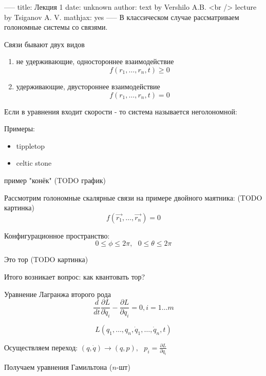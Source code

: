 -----
title: Лекция 1
date: unknown
author: text by Vershilo A.B. <br /> lecture by Tsiganov A. V.
mathjax: yes
-----
В классическом случае рассматриваем голономные системы со связями.

Связи бывают двух видов

\begin{enumerate}
  \item не удерживающие, одностороннее взаимодействие
    $$ f(r_1,\ldots,r_n,t)\geq 0 $$
  \item удерживающие, двустороннее взаимодействие
    $$ f(r_1,\ldots,r_n,t)=0$$
\end{enumerate}

\begin{definition}
Если в уравнения входит скорости - то система называется неголономной:
\end{definition}

Примеры:
\begin{itemize}
  \item tippletop
  \item celtic stone
\end{itemize}

пример "конёк" (TODO график)

Рассмотрим голономные скалярные связи на примере двойного маятника:
(TODO картинка)
\begin{equation}
  f(\vec{r_1},\ldots,\vec{r_n}) = 0
\end{equation}

Конфигурационное пространство:
\begin{equation}
  0 \leq \phi \leq 2\pi,~~~ 0 \leq \theta \leq 2\pi
\end{equation}

Это тор (TODO картинка)

Итого возникает вопрос: как квантовать тор?

Уравнение Лагранжа второго рода
\begin{equation}
\dfrac{d}{dt} \frac{\partial L}{\partial \dot{q}_i} - \frac{\partial L}{\partial q_i} = 0, i=1\ldots m
\end{equation}

\begin{equation}
L(q_1,\ldots,q_n,\dot{q}_1,\ldots,\dot{q}_n,t)
\end{equation}

Осуществляем переход: $(q,\dot{q}) \rightarrow (q,p), ~~~ p_i = \frac{\partial L}{\partial \dot{q}_i}$

Получаем уравнения Гамильтона ($n$-шт)

